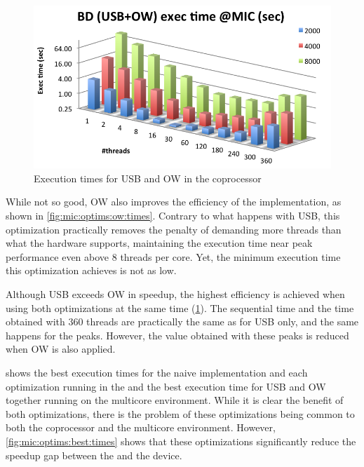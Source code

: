 \documentclass[../thesis]{subfiles}
\begin{document}
	\begin{figure}[p]
		\centering
		\includegraphics[height=0.25\textheight]{assets/images/mic/optims/mic-usbow-times.png}
		\caption{Execution times for USB and OW in the \intel\xeonphi coprocessor}
		\label{fig:mic:optims:usbow:times}
	\end{figure}

	While not so good, OW also improves the efficiency of the implementation, as shown in \cref{fig:mic:optims:ow:times}. Contrary to what happens with USB, this optimization practically removes the penalty of demanding more threads than what the hardware supports, maintaining the execution time near peak performance even above 8 threads per core. Yet, the minimum execution time this optimization achieves is not as low.

	Although USB exceeds OW in speedup, the highest efficiency is achieved when using both optimizations at the same time (\cref{fig:mic:optims:usbow:times}). The sequential time and the time obtained with 360 threads are practically the same as for USB only, and the same happens for the peaks. However, the value obtained with these peaks is reduced when OW is also applied.

	 shows the best execution times for the naive implementation and each optimization running in the \intel\xeonphi and the best execution time for USB and OW together running on the multicore environment. While it is clear the benefit of both optimizations, there is the problem of these optimizations being common to both the coprocessor and the multicore environment. However, \cref{fig:mic:optims:best:times} shows that these optimizations significantly reduce the speedup gap between the \cpu and the device.
\end{document}

